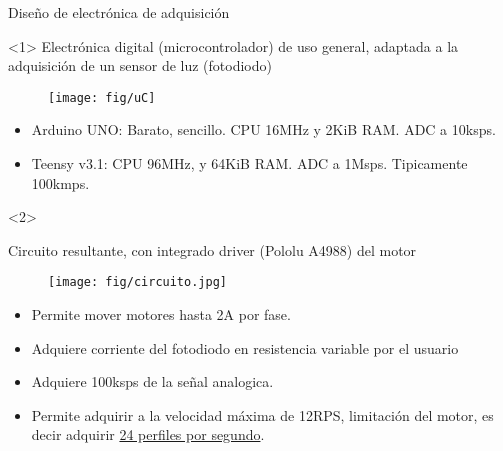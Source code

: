 \begin{frame}{Diseño de electrónica de adquisición}
\begin{onlyenv}<1>
Electrónica digital (microcontrolador) de uso general, adaptada a la adquisición de un sensor de luz (fotodiodo)
\begin{minipage}[t]{0.5\textwidth}
\begin{figure}[H]
\centering
\texttt{[image: fig/uC]}
\label{fig:uC}
\end{figure}
\end{minipage}
%
\begin{minipage}[t]{0.45\textwidth}
\begin{itemize}
\item Arduino UNO: Barato, sencillo. CPU 16MHz y 2KiB RAM. ADC a 10ksps.
\item Teensy v3.1: CPU 96MHz, y 64KiB RAM. ADC a 1Msps. Tipicamente 100kmps.
\end{itemize}
\end{minipage}
\end{onlyenv}
\begin{onlyenv}<2>

Circuito resultante, con integrado driver (Pololu A4988) del motor
\begin{minipage}[t]{0.5\textwidth}
\begin{figure}
\centering
\texttt{[image: fig/circuito.jpg]}
\label{fig:circuito}
\end{figure}
\end{minipage}
%
\begin{minipage}[t]{0.45\textwidth}
\begin{itemize}
\item Permite mover motores hasta 2A por fase.
\item Adquiere corriente del fotodiodo en resistencia variable por el usuario
\item Adquiere 100ksps de la señal analogica.
\item Permite adquirir a la velocidad máxima de 12RPS, limitación del motor, es decir adquirir \underline{24 perfiles por segundo}.
\end{itemize}
\end{minipage}
\end{onlyenv}
\end{frame}


